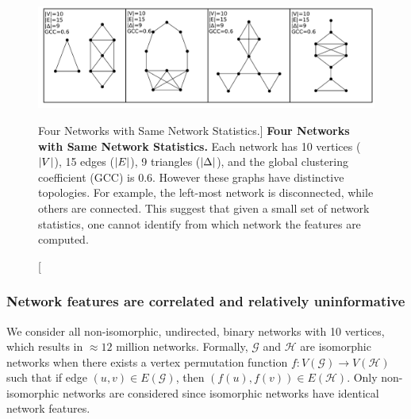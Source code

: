 \begin{figure}
    \centering
    \includegraphics[width=.9\textwidth]{figures/dnd/exp5_10nodes_row}
    \caption
    [Four Networks with Same Network Statistics.]
    {\textbf{Four Networks with Same Network Statistics.} Each network has 10 vertices ($\left \lvert V \right \rvert$), 15 edges ($\left \lvert E \right \rvert$), 9 triangles ($\left \lvert \Delta \right \rvert$), and the global clustering coefficient (GCC) is 0.6. However these graphs have distinctive topologies. For example, the left-most network is disconnected, while others are connected. This suggest that given a small set of network statistics, one cannot identify from which network the features are computed.
    }
    \label{fig:exp5}
\end{figure}

\subsubsection{Network features are correlated and relatively uninformative}
We consider all non-isomorphic, undirected, binary networks with 10 vertices, which results in $\approx12$ million networks. Formally, $\mathcal{G}$ and $\mathcal{H}$ are isomorphic networks when there exists a vertex permutation function $f:V(\mathcal{G})\rightarrow V(\mathcal{H})$ such that if edge $(u,v)\in E(\mathcal{G})$, then $(f(u), f(v))\in E(\mathcal{H})$. Only non-isomorphic networks are considered since isomorphic networks have identical network features.

